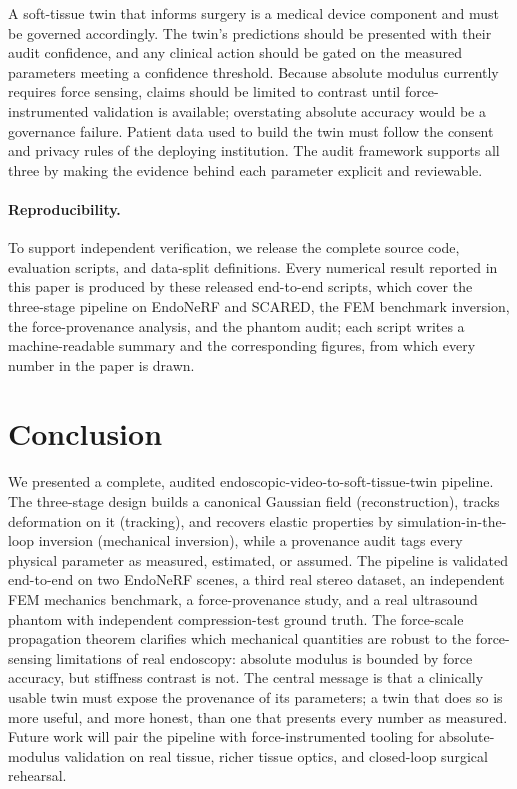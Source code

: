 \documentclass[review]{elsarticle}
\begin{document}
A soft-tissue twin that informs surgery is a medical device component and
must be governed accordingly. The twin's predictions should be presented
with their audit confidence, and any clinical action should be gated on the
measured parameters meeting a confidence threshold. Because absolute
modulus currently requires force sensing, claims should be limited to
contrast until force-instrumented validation is available; overstating
absolute accuracy would be a governance failure. Patient data used to build
the twin must follow the consent and privacy rules of the deploying
institution. The audit framework supports all three by making the evidence
behind each parameter explicit and reviewable.

\paragraph{Reproducibility.}\label{sec:repro}
To support independent verification, we release the complete source code,
evaluation scripts, and data-split definitions. Every numerical result
reported in this paper is produced by these released end-to-end scripts,
which cover the three-stage pipeline on EndoNeRF and SCARED, the FEM
benchmark inversion, the force-provenance analysis, and the phantom audit;
each script writes a machine-readable summary and the corresponding
figures, from which every number in the paper is drawn.

\section{Conclusion}
\label{sec:conclusion}
We presented a complete, audited endoscopic-video-to-soft-tissue-twin
pipeline. The three-stage design builds a canonical Gaussian field (reconstruction),
tracks deformation on it (tracking), and recovers elastic properties by
simulation-in-the-loop inversion (mechanical inversion), while a provenance audit tags
every physical parameter as measured, estimated, or assumed. The pipeline
is validated end-to-end on two EndoNeRF scenes, a third real stereo
dataset, an independent FEM mechanics benchmark, a force-provenance study,
and a real ultrasound phantom with independent compression-test ground
truth. The force-scale propagation theorem clarifies which mechanical
quantities are robust to the force-sensing limitations of real endoscopy:
absolute modulus is bounded by force accuracy, but stiffness contrast is
not. The central message is that a clinically usable twin must expose the
provenance of its parameters; a twin that does so is more useful, and more
honest, than one that presents every number as measured. Future work will
pair the pipeline with force-instrumented tooling for absolute-modulus
validation on real tissue, richer tissue optics, and closed-loop surgical
rehearsal.
\end{document}
